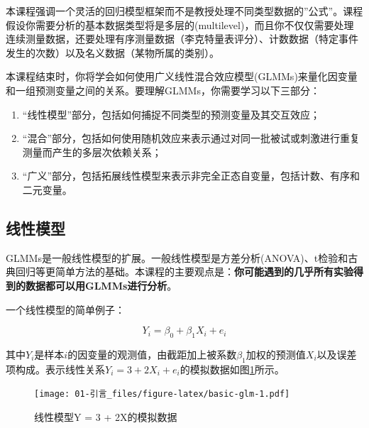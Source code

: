 \documentclass[
]{book}
\providecommand{\tightlist}{%
  \setlength{\itemsep}{0pt}\setlength{\parskip}{0pt}}
\begin{document}
本课程强调一个灵活的回归模型框架而不是教授处理不同类型数据的''公式''。课程假设你需要分析的基本数据类型将是多层的(multilevel)，而且你不仅仅需要处理连续测量数据，还要处理有序测量数据（李克特量表评分）、计数数据（特定事件发生的次数）以及名义数据（某物所属的类别）。

本课程结束时，你将学会如何使用广义线性混合效应模型(GLMMs)来量化因变量和一组预测变量之间的关系。要理解GLMMs，你需要学习以下三部分：

\begin{enumerate}
\def\labelenumi{\arabic{enumi}.}
\tightlist
\item
  ``线性模型''部分，包括如何捕捉不同类型的预测变量及其交互效应；
\item
  ``混合''部分，包括如何使用随机效应来表示通过对同一批被试或刺激进行重复测量而产生的多层次依赖关系；
\item
  ``广义''部分，包括拓展线性模型来表示非完全正态自变量，包括计数、有序和二元变量。
\end{enumerate}

\hypertarget{ux7ebfux6027ux6a21ux578b}{%
\subsection{线性模型}\label{ux7ebfux6027ux6a21ux578b}}

GLMMs是一般线性模型的扩展。一般线性模型是方差分析(ANOVA)、t检验和古典回归等更简单方法的基础。本课程的主要观点是：\textbf{你可能遇到的几乎所有实验得到的数据都可以用GLMMs进行分析}。

一个线性模型的简单例子：

\[Y_i = \beta_0 + \beta_1 X_i + e_i\]

其中\(Y_i\)是样本\(i\)的因变量的观测值，由截距加上被系数\(\beta_1\)加权的预测值\(X_i\)以及误差项构成。表示线性关系\(Y_i = 3 + 2X_i + e_i\)的模拟数据如图\ref{fig:basic-glm}所示。

\begin{figure}
\centering
\texttt{[image: 01-引言\_files/figure-latex/basic-glm-1.pdf]}
\caption{\label{fig:basic-glm}线性模型Y = 3 + 2X的模拟数据}
\end{figure}
\end{document}
